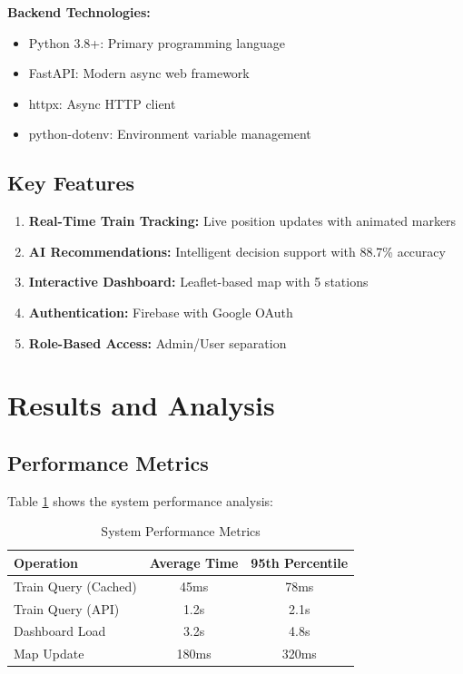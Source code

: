 \documentclass[12pt,a4paper]{article}
\begin{document}
\textbf{Backend Technologies:}
\begin{itemize}
    \item Python 3.8+: Primary programming language
    \item FastAPI: Modern async web framework
    \item httpx: Async HTTP client
    \item python-dotenv: Environment variable management
\end{itemize}

\subsection{Key Features}

\begin{enumerate}
    \item \textbf{Real-Time Train Tracking:} Live position updates with animated markers
    \item \textbf{AI Recommendations:} Intelligent decision support with 88.7\% accuracy
    \item \textbf{Interactive Dashboard:} Leaflet-based map with 5 stations
    \item \textbf{Authentication:} Firebase with Google OAuth
    \item \textbf{Role-Based Access:} Admin/User separation
\end{enumerate}

\section{Results and Analysis}

\subsection{Performance Metrics}

Table \ref{tab:performance} shows the system performance analysis:

\begin{table}[H]
\centering
\caption{System Performance Metrics}
\label{tab:performance}
\begin{tabular}{lcc}
\toprule
\textbf{Operation} & \textbf{Average Time} & \textbf{95th Percentile} \\
\midrule
Train Query (Cached) & 45ms & 78ms \\
Train Query (API) & 1.2s & 2.1s \\
Dashboard Load & 3.2s & 4.8s \\
Map Update & 180ms & 320ms \\
\bottomrule
\end{tabular}
\end{table}
\end{document}
